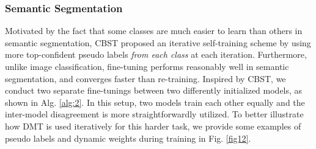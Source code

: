 \documentclass[preprint,review,10pt]{elsarticle}
\begin{document}
\BlankLine


\subsubsection{Semantic Segmentation}
\label{sec:422}

Motivated by the fact that some classes are much easier to learn than others in semantic segmentation, CBST \cite{cbst} proposed an iterative self-training scheme by using more top-confident pseudo labels \textit{from each class} at each iteration. Furthermore, unlike image classification, fine-tuning performs reasonably well in semantic segmentation, and converges faster than re-training. Inspired by CBST, we conduct two separate fine-tunings between two differently initialized models, as shown in Alg. \ref{alg:2}. In this setup, two models train each other equally and the inter-model disagreement is more straightforwardly utilized. To better illustrate how DMT is used iteratively for this harder task, we provide some examples of pseudo labels and dynamic weights during training in Fig. \ref{fig12}.
\end{document}
